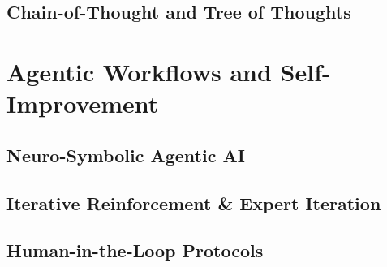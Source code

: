 \subsection{Chain-of-Thought and Tree of Thoughts}

\section{Agentic Workflows and Self-Improvement}

\subsection{Neuro-Symbolic Agentic AI}

\subsection{Iterative Reinforcement \& Expert Iteration}

\subsection{Human-in-the-Loop Protocols}